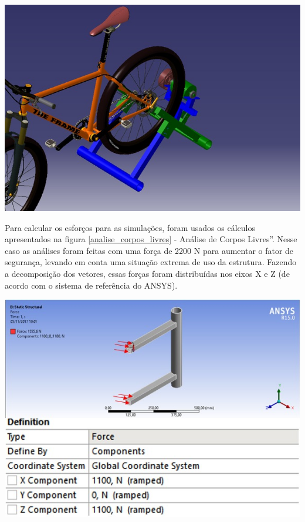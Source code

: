     \begin{center}
    	\includegraphics[scale=0.5]{figuras/acoplamento_est_1}
        \label{acoplamento_est_1}
    \end{center}      
  
    Para calcular os esforços para as simulações, foram usados os cálculos apresentados na figura \ref{analise_corpos_livres} - Análise de Corpos Livres”.  Nesse caso as análises foram feitas com uma força de 2200 N para aumentar o fator de segurança, levando em conta uma situação extrema de uso da estrutura. Fazendo a decomposição dos vetores, essas forças foram distribuídas nos eixos X e Z (de acordo com o sistema de referência do ANSYS).

    \begin{center}
    	\includegraphics[scale=0.7]{figuras/forcas_1}
        \label{forcas_1}
    \end{center}   
     
